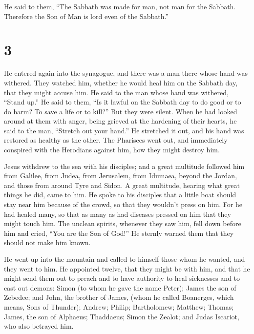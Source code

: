  He said to them, ``The Sabbath was made for man, not man
for the Sabbath.  Therefore the Son of Man is lord even of
the Sabbath.''

\hypertarget{section-2}{%
\section{3}\label{section-2}}

 He entered again into the synagogue, and there was a man
there whose hand was withered.  They watched him, whether he
would heal him on the Sabbath day, that they might accuse him.
 He said to the man whose hand was withered, ``Stand up.''
 He said to them, ``Is it lawful on the Sabbath day to do
good or to do harm? To save a life or to kill?'' But they were silent.
 When he had looked around at them with anger, being grieved
at the hardening of their hearts, he said to the man, ``Stretch out your
hand.'' He stretched it out, and his hand was restored as healthy as the
other.  The Pharisees went out, and immediately conspired
with the Herodians against him, how they might destroy him.

 Jesus withdrew to the sea with his disciples; and a great
multitude followed him from Galilee, from Judea,  from
Jerusalem, from Idumaea, beyond the Jordan, and those from around Tyre
and Sidon. A great multitude, hearing what great things he did, came to
him.  He spoke to his disciples that a little boat should
stay near him because of the crowd, so that they wouldn't press on him.
 For he had healed many, so that as many as had diseases
pressed on him that they might touch him.  The unclean
spirits, whenever they saw him, fell down before him and cried, ``You
are the Son of God!''  He sternly warned them that they
should not make him known.

 He went up into the mountain and called to himself those
whom he wanted, and they went to him.  He appointed twelve,
that they might be with him, and that he might send them out to preach
 and to have authority to heal sicknesses and to cast out
demons:  Simon (to whom he gave the name Peter);
 James the son of Zebedee; and John, the brother of James,
(whom he called Boanerges, which means, Sons of Thunder); 
Andrew; Philip; Bartholomew; Matthew; Thomas; James, the son of
Alphaeus; Thaddaeus; Simon the Zealot;  and Judas Iscariot,
who also betrayed him.

